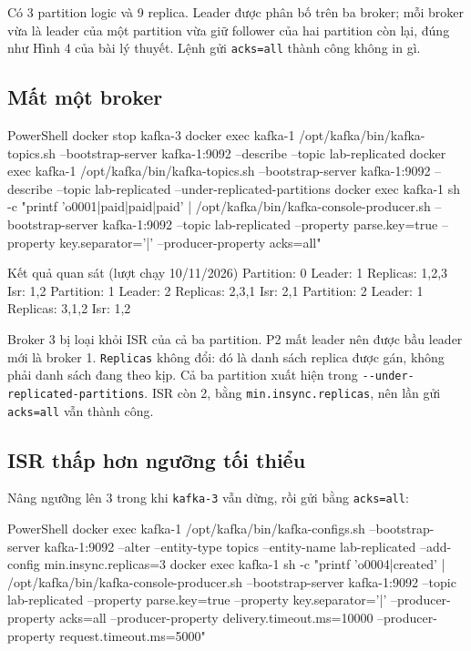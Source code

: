 Có 3 partition logic và 9 replica. Leader được phân bố trên ba broker; mỗi broker vừa là leader của một partition vừa giữ follower của hai partition còn lại, đúng như Hình 4 của bài lý thuyết. Lệnh gửi \texttt{acks=\allowbreak{}all} thành công không in gì.


\subsection{Mất một broker}

\begin{aivncodebox}[language={}]{PowerShell}
docker stop kafka-3
docker exec kafka-1 /opt/kafka/bin/kafka-topics.sh --bootstrap-server kafka-1:9092 --describe --topic lab-replicated
docker exec kafka-1 /opt/kafka/bin/kafka-topics.sh --bootstrap-server kafka-1:9092 --describe --topic lab-replicated --under-replicated-partitions
docker exec kafka-1 sh -c "printf 'o0001|paid|paid|paid\n' | /opt/kafka/bin/kafka-console-producer.sh --bootstrap-server kafka-1:9092 --topic lab-replicated --property parse.key=true --property key.separator='|' --producer-property acks=all"
\end{aivncodebox}

\begin{aivnCodeOutput}{Kết quả quan sát (lượt chạy 10/11/2026)}
Partition: 0  Leader: 1  Replicas: 1,2,3  Isr: 1,2
Partition: 1  Leader: 2  Replicas: 2,3,1  Isr: 2,1
Partition: 2  Leader: 1  Replicas: 3,1,2  Isr: 1,2
\end{aivnCodeOutput}

Broker 3 bị loại khỏi ISR của cả ba partition. P2 mất leader nên được bầu leader mới là broker 1. \texttt{Replicas} không đổi: đó là danh sách replica được gán, không phải danh sách đang theo kịp. Cả ba partition xuất hiện trong \texttt{-\allowbreak{}-\allowbreak{}under-\allowbreak{}replicated-\allowbreak{}partitions}. ISR còn 2, bằng \texttt{min.\allowbreak{}insync.\allowbreak{}replicas}, nên lần gửi \texttt{acks=\allowbreak{}all} vẫn thành công.


\subsection{ISR thấp hơn ngưỡng tối thiểu}

Nâng ngưỡng lên 3 trong khi \texttt{kafka-\allowbreak{}3} vẫn dừng, rồi gửi bằng \texttt{acks=\allowbreak{}all}:


\begin{aivncodebox}[language={}]{PowerShell}
docker exec kafka-1 /opt/kafka/bin/kafka-configs.sh --bootstrap-server kafka-1:9092 --alter --entity-type topics --entity-name lab-replicated --add-config min.insync.replicas=3
docker exec kafka-1 sh -c "printf 'o0004|created\n' | /opt/kafka/bin/kafka-console-producer.sh --bootstrap-server kafka-1:9092 --topic lab-replicated --property parse.key=true --property key.separator='|' --producer-property acks=all --producer-property delivery.timeout.ms=10000 --producer-property request.timeout.ms=5000"
\end{aivncodebox}

